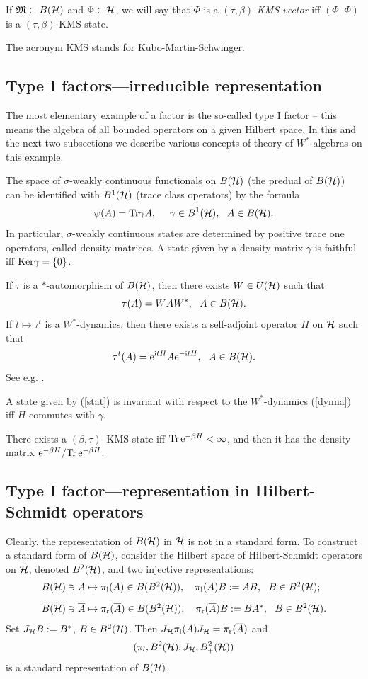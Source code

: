 \documentclass{svmult}
\def\bar{\overline}
\def\l{{\rm l}}
\def\r{{\rm r}}
\def\fM{{\mathfrak M}}
\def\i{{\rm i}}
\def\Tr{{\rm Tr}}
\def\Ker{{\rm Ker}}
\def\e{{\rm e}}
\def\cH{{\cal H}}
\def\l{{\rm l}}
\def\r{{\rm r}}
\def\Tr{{\rm Tr}}
\def\Ker{{\rm Ker}}
\def\e{{\rm e}}
\def\cH{{\cal H}}
\begin{document}
If $\fM\subset B(\cH)$ and 
$\Phi\in\cH$, we will say that $\Phi$ is a {\em  $(\tau,\beta)$-KMS vector} iff
$(\Phi|\cdot\Phi)$ is a $(\tau,\beta)$-KMS state.

The acronym KMS stands for Kubo-Martin-Schwinger.
\subsection{Type I factors---irreducible representation}


The most elementary example of a factor is the so-called type I factor -- this
means the algebra of all bounded
operators on a given Hilbert space. In this and the next two subsections we
describe various concepts of theory of $W^*$-algebras on this example.

The space of $\sigma$-weakly continuous functionals on
 $B(\cH)$ (the predual of $B(\cH)$) can be identified with $B^1(\cH)$
(trace class operators) by the formula
\begin{equation} \psi(A)=\Tr\gamma A,\ \  \ \ \gamma\in
B^1(\cH),\ \ A\in B(\cH).\label{stat}\end{equation} 
In particular, $\sigma$-weakly continuous
states are determined by positive trace one operators,
called density matrices. A state given by a density matrix $\gamma$ is
faithful iff $\Ker\gamma=\{0\}$.

If $\tau$ is a $*$-automorphism of $B(\cH)$, then there exists  $W\in U(\cH)$
such that
\begin{equation} \tau(A)=WAW^*,\ \ A\in B(\cH).\label{dynna}\end{equation}
If $ t\mapsto \tau^t$ is a
$W^*$-dynamics, then there 
exists a self-adjoint operator $H$ on $\cH$ such that
\[\tau^t(A)=\e^{\i tH}A\e^{-\i tH},\ \  A\in B(\cH).\]
See e.g. \cite{BR1}.

A state given by (\ref{stat})
 is invariant with respect to the
$W^*$-dynamics (\ref{dynna}) iff $H$ commutes
with $\gamma$. 

There exists a $(\beta,\tau)$--KMS state iff $\Tr\,\e^{-\beta
H}<\infty$, and then it has the density matrix $\e^{-\beta
H}/\Tr\,\e^{-\beta H}$.

\subsection{Type I factor---representation in Hilbert-Schmidt
 operators}
\label{I.I}
Clearly, the representation of $B(\cH)$ in $\cH$ is not in a standard
form.
To construct a standard form of $B(\cH)$, 
consider the Hilbert space of Hilbert-Schmidt operators on $\cH$,
denoted $B^2(\cH)$, and two injective representations:
\begin{equation}\begin{array}{l}
B(\cH)\ni A\mapsto\pi_\l(A)\in B(B^2(\cH)),\ \ \ \pi_\l(A)B:=AB,
\ \ B\in B^2(\cH);\\[3mm]
\bar{B(\cH)}\ni \bar A\mapsto\pi_\r(\bar A)\in B(B^2(\cH)),
\ \ \ \pi_\r(\bar A)B 
:=B A^*,
\ \ B\in B^2(\cH).\end{array}\label{repr}\end{equation}
Set $J_\cH B:=B^*$, $B\in B^2(\cH)$. Then
$J_\cH \pi_\l(A) J_\cH =\pi_\r(\bar A)$ and
\[(\pi_l,B^2(\cH),J_\cH,B^2_+(\cH))\] is a standard representation of $B(\cH)$.
\end{document}
